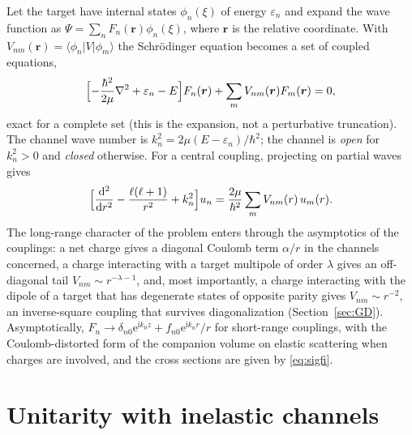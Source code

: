 \documentclass[11pt,a4paper]{book}
\numberwithin{equation}{chapter}
\newcommand{\dd}{\mathrm{d}}
\newcommand{\ii}{\mathrm{i}}
\newcommand{\ee}{\mathrm{e}}
\newcommand{\vr}{\bm{r}}
\begin{document}
Let the target have internal states $\phi_n(\xi)$ of energy $\varepsilon_n$ and
expand the wave function as $\Psi=\sum_nF_n(\vr)\phi_n(\xi)$, where $\vr$ is the
relative coordinate. With $V_{nm}(\vr)=\langle\phi_n|V|\phi_m\rangle$ the
Schr\"odinger equation becomes a set of coupled equations,
\begin{equation}\label{eq:cc}
  \Bigl[-\frac{\hbar^2}{2\mu}\nabla^2+\varepsilon_n-E\Bigr]F_n(\vr)
  +\sum_mV_{nm}(\vr)F_m(\vr)=0,
\end{equation}
exact for a complete set (this is the expansion, not a perturbative truncation).
The channel wave number is $k_n^2=2\mu(E-\varepsilon_n)/\hbar^2$; the channel is
\emph{open} for $k_n^2>0$ and \emph{closed} otherwise. For a central coupling,
projecting on partial waves gives
\begin{equation}\label{eq:cc-radial}
  \Bigl[\frac{\dd^2}{\dd r^2}-\frac{\ell(\ell+1)}{r^2}+k_n^2\Bigr]u_n
  =\frac{2\mu}{\hbar^2}\sum_mV_{nm}(r)\,u_m(r).
\end{equation}
The long-range character of the problem enters through the asymptotics of the
couplings: a net charge gives a diagonal Coulomb term $\alpha/r$ in the channels
concerned, a charge interacting with a target multipole of order $\lambda$ gives an
off-diagonal tail $V_{nm}\sim r^{-\lambda-1}$, and, most importantly, a charge
interacting with the dipole of a target that has degenerate states of opposite
parity gives $V_{nm}\sim r^{-2}$, an inverse-square coupling that survives
diagonalization (Section~\ref{sec:GD}). Asymptotically,
$F_n\to\delta_{n0}\ee^{\ii k_0z}+f_{n0}\ee^{\ii k_nr}/r$ for short-range
couplings, with the Coulomb-distorted form of the companion volume on elastic scattering
when charges are involved, and the cross sections are given by \eqref{eq:sigfi}.

\section{Unitarity with inelastic channels}\label{sec:unitarity}
\end{document}
